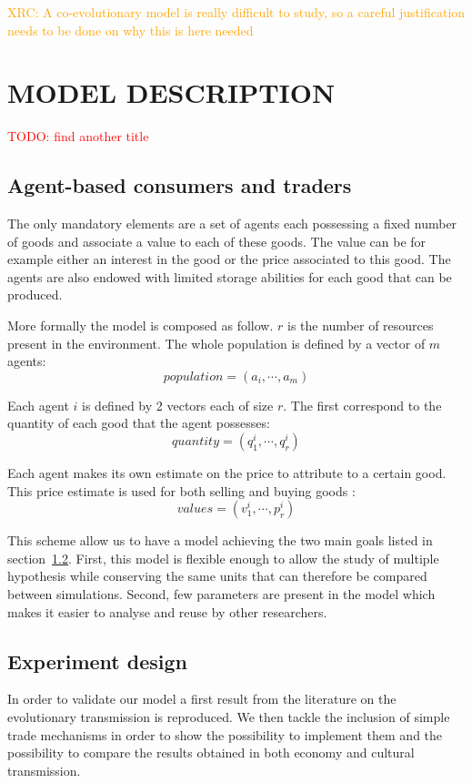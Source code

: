 \documentclass{wscpaperproc}
\newcommand{\memo}[2]{\textcolor{#1}{#2}}
\newcommand{\todo}[1]{\memo{red}{TODO: #1\\}}
\newcommand{\xrc}[1]{\memo{orange}{XRC: #1\\}}
\begin{document}
\xrc{A co-evolutionary model is really difficult to study, so a careful justification needs to be done on why this is here needed}

\section{MODEL DESCRIPTION}

\todo{find another title}
\subsection{Agent-based consumers and traders}

The only mandatory elements are a set of agents each possessing a fixed number of goods and associate a value to each of these goods. The value can be for example either an interest in the good or the price associated to this good. The agents are also endowed with limited storage abilities for each good that can be produced. 


More formally the model is composed as follow. $r$ is the number of resources present in the environment. The whole population is defined by a vector of $m$ agents: 
$$ population = (a_i, \cdots ,a_m) $$
		
Each agent $i$ is defined by 2 vectors each of size $r$. The first correspond to the quantity of each good that the agent possesses: $$ quantity = (q^i_1,\cdots,q^i_r) $$

Each agent makes its own estimate on the price to attribute to a certain good. This price estimate is used for both selling and buying goods :
$$ values = (v^i_1,\cdots,p^i_r) $$

This scheme allow us to have a model achieving the two main goals listed in section~\ref{}. First, this model is flexible enough to allow the study of multiple hypothesis while conserving the same units that can therefore be compared between simulations. Second, few parameters are present in the model which makes it easier to analyse and reuse by other researchers.


\subsection{Experiment design}

In order to validate our model a first result from the literature on the evolutionary transmission is reproduced. We then tackle the inclusion of simple trade mechanisms in order to show the possibility to implement them and the possibility to compare the results obtained in both economy and cultural transmission.
\end{document}
